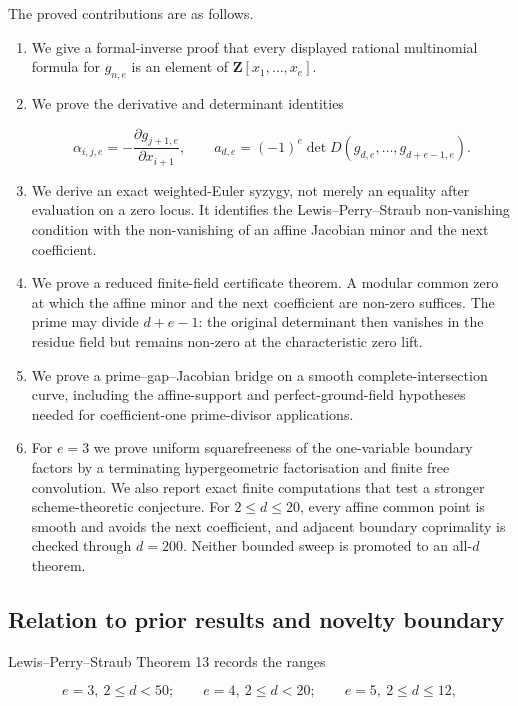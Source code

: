\documentclass[
]{article}
\begin{document}
The proved contributions are as follows.

\begin{enumerate}
\def\labelenumi{\arabic{enumi}.}
\item
  We give a formal-inverse proof that every displayed rational
  multinomial formula for \(g_{n,e}\) is an element of
  \(\mathbf Z[x_1,\ldots,x_e]\).
\item
  We prove the derivative and determinant identities

  \[
  \alpha_{i,j,e}=-\frac{\partial g_{j+1,e}}{\partial x_{i+1}},
  \qquad
  a_{d,e}=(-1)^e\det D(g_{d,e},\ldots,g_{d+e-1,e}).
  \]
\item
  We derive an exact weighted-Euler syzygy, not merely an equality after
  evaluation on a zero locus. It identifies the Lewis--Perry--Straub
  non-vanishing condition with the non-vanishing of an affine Jacobian
  minor and the next coefficient.
\item
  We prove a reduced finite-field certificate theorem. A modular common
  zero at which the affine minor and the next coefficient are non-zero
  suffices. The prime may divide \(d+e-1\): the original determinant
  then vanishes in the residue field but remains non-zero at the
  characteristic zero lift.
\item
  We prove a prime--gap--Jacobian bridge on a smooth
  complete-intersection curve, including the affine-support and
  perfect-ground-field hypotheses needed for coefficient-one
  prime-divisor applications.
\item
  For \(e=3\) we prove uniform squarefreeness of the one-variable
  boundary factors by a terminating hypergeometric factorisation and
  finite free convolution. We also report exact finite computations that
  test a stronger scheme-theoretic conjecture. For \(2\le d\le20\),
  every affine common point is smooth and avoids the next coefficient,
  and adjacent boundary coprimality is checked through \(d=200\).
  Neither bounded sweep is promoted to an all-\(d\) theorem.
\end{enumerate}

\subsection{Relation to prior results and novelty
boundary}\label{relation-to-prior-results-and-novelty-boundary}

Lewis--Perry--Straub Theorem 13 records the ranges

\[
e=3,\ 2\le d<50;\qquad
e=4,\ 2\le d<20;\qquad
e=5,\ 2\le d\le12,
\]
\end{document}
